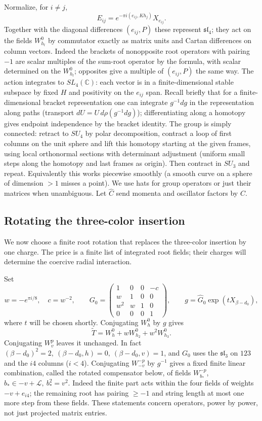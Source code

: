 Normalize, for \(i\ne j\),
\[
 E_{ij}=e^{-\pi i(e_{ij},K h_j)} X_{e_{ij}} .
\]
Together with the diagonal differences \((e_{ij},P)\) these represent \(\mathfrak{sl}_4\); they act on the fields \(W_{h_l}^0\) by commutator exactly as matrix units and Cartan differences on column vectors. Indeed the brackets of nonopposite root operators with pairing \(-1\) are scalar multiples of the sum-root operator by the formula, with scalar determined on the \(W_{h_l}^0\); opposites give a multiple of \((e_{ij},P)\) the same way. The action integrates to \(SL_4(\mathbb C)\): each vector is in a finite-dimensional stable subspace by fixed \(H\) and positivity on the \(e_{ij}\) span. Recall briefly that for a finite-dimensional bracket representation one can integrate \(g^{-1}dg\) in the representation along paths (transport \(dU=U\,d\rho(g^{-1}dg)\)); differentiating along a homotopy gives endpoint independence by the bracket identity. The group is simply connected: retract to \(SU_4\) by polar decomposition, contract a loop of first columns on the unit sphere and lift this homotopy starting at the given frames, using local orthonormal sections with determinant adjustment (uniform small steps along the homotopy and last frames as origin). Then contract in \(SU_3\) and repeat. Equivalently this works piecewise smoothly (a smooth curve on a sphere of dimension \(>1\) misses a point). We use hats for group operators or just their matrices when unambiguous. Let \(\widehat C\) send momenta and oscillator factors by \(C\).

\subsection{Rotating the three-color insertion}

We now choose a finite root rotation that replaces the three-color insertion by one charge. The price is a finite list of integrated root fields; their charges will determine the coercive radial interaction.

Set
\[
 w=-e^{\pi i/8},\quad c=w^{-2},\qquad
 G_0=\begin{pmatrix}1&0&0&-c\\ w&1&0&0\\ w^2&w&1&0\\0&0&0&1\end{pmatrix},
 \qquad g=\widehat G_0\exp(t X_{\beta-d_0}),
\]
where \(t\) will be chosen shortly. Conjugating \(W_h^0\) by \(g\) gives
\[
 \widetilde T=W_h^0+w W_{h_2}^0+w^2 W_{h_3}^0.
\]
Conjugating \(W_v^p\) leaves it unchanged. In fact \((\beta-d_0)^2=2,\ (\beta-d_0,h)=0,\ (\beta-d_0,v)=1\), and \(G_0\) uses the \(\mathfrak{sl}_3\) on \(123\) and the \(i4\) columns (\(i<4\)). Conjugating \(W_{-v}^{-p}\) by \(g^{-1}\) gives a fixed finite linear combination, called the rotated compensator below, of fields \(W_{b_*}^{-p}\), \(b_*\in-v+\mathcal L,\ b_*^2=v^2\). Indeed the finite part acts within the four fields of weights \(-v+e_{i4}\); the remaining root has pairing \(\ge-1\) and string length at most one more step from these fields. These statements concern operators, power by power, not just projected matrix entries.


